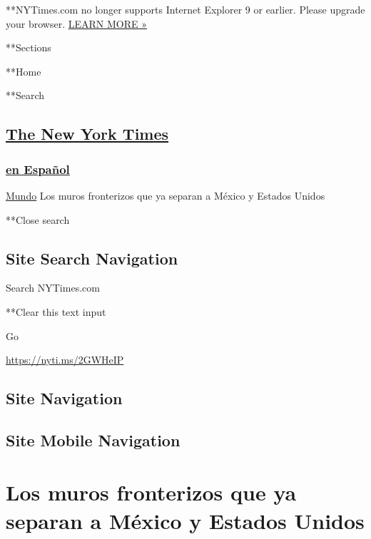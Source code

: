  **NYTimes.com no longer supports Internet Explorer 9 or earlier. Please
upgrade your browser.
\href{http://www.nytimes3xbfgragh.onion/content/help/site/ie9-support.html}{LEARN
MORE »}

**Sections

**Home

**Search

\hypertarget{the-new-york-times}{%
\subsection{\texorpdfstring{\href{http://www.nytimes3xbfgragh.onion/}{The
New York Times}}{The New York Times}}\label{the-new-york-times}}

\hypertarget{-en-espauxf1ol-}{%
\subsubsection{\texorpdfstring{ \href{/es/}{en Español}
}{ en Español }}\label{-en-espauxf1ol-}}

 \href{/es/section/mundo}{Mundo} \textbar{}Los muros fronterizos que ya
separan a México y Estados Unidos

**Close search

\hypertarget{site-search-navigation}{%
\subsection{Site Search Navigation}\label{site-search-navigation}}

Search NYTimes.com

**Clear this text input

Go

\url{https://nyti.ms/2GWHeIP}

\hypertarget{site-navigation}{%
\subsection{Site Navigation}\label{site-navigation}}

\hypertarget{site-mobile-navigation}{%
\subsection{Site Mobile Navigation}\label{site-mobile-navigation}}

\hypertarget{los-muros-fronterizos-que-ya-separan-a-muxe9xico-y-estados-unidos}{%
\section{Los muros fronterizos que ya separan a México y Estados
Unidos}\label{los-muros-fronterizos-que-ya-separan-a-muxe9xico-y-estados-unidos}}

